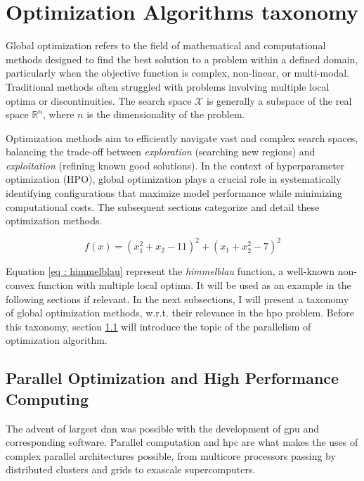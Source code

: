 \section{Optimization Algorithms taxonomy}
\label{sec : opt_algo}

Global optimization refers to the field of mathematical and computational methods designed to find the best solution to a problem within a defined domain, particularly when the objective function is complex, non-linear, or multi-modal. Traditional methods often struggled with problems involving multiple local optima or discontinuities. The search space $\mathcal X$ is generally a subspace of the real space $\mathbb{R}^n$, where $n$ is the dimensionality of the problem.

Optimization methods aim to efficiently navigate vast and complex search spaces, balancing the trade-off between \textit{exploration} (searching new regions) and \textit{exploitation} (refining known good solutions). In the context of hyperparameter optimization (HPO), global optimization plays a crucial role in systematically identifying configurations that maximize model performance while minimizing computational costs. The subsequent sections categorize and detail these optimization methods. 

\begin{equation}
    f(x) = (x_1^2 + x_2 - 11)^2 + (x_1 + x_2^2 - 7)^2
    \label{eq : himmelblau}
\end{equation}

Equation \ref{eq : himmelblau} represent the \textit{himmelblau} function, a well-known non-convex function with multiple local optima. It will be used as an example in the following sections if relevant. In the next subsections, I will present a taxonomy of global optimization methods, w.r.t. their relevance in the \acrshort{hpo} problem. Before this taxonomy, section \ref{sec:hpc} will introduce the topic of the parallelism of optimization algorithm.



\subsection{Parallel Optimization and High Performance Computing}
\label{sec:hpc}
The advent of largest \acrshort{dnn} was possible with the development of \acrfull{gpu} and corresponding software. Parallel computation and \acrfull{hpc} are what makes the uses of complex parallel architectures possible, from multicore processors passing by distributed clusters and grids to \Gls{exascale} supercomputers.

